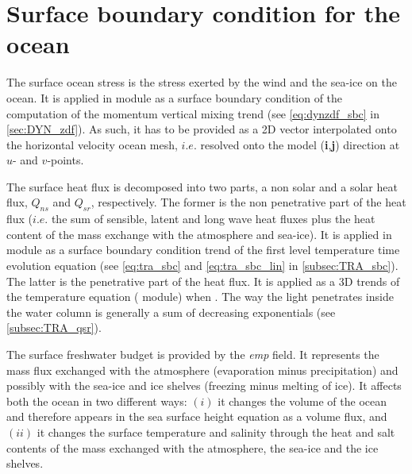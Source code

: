 \documentclass[../tex_main/NEMO_manual]{subfiles}
\begin{document}
\section{Surface boundary condition for the ocean}
\label{sec:SBC_general}

The surface ocean stress is the stress exerted by the wind and the sea-ice 
on the ocean. It is applied in  module as a surface boundary condition of the 
computation of the momentum vertical mixing trend (see \autoref{eq:dynzdf_sbc} in \autoref{sec:DYN_zdf}).
As such, it has to be provided as a 2D vector interpolated 
onto the horizontal velocity ocean mesh, $i.e.$ resolved onto the model 
(\textbf{i},\textbf{j}) direction at $u$- and $v$-points.

The surface heat flux is decomposed into two parts, a non solar and a solar heat 
flux, $Q_{ns}$ and $Q_{sr}$, respectively. The former is the non penetrative part 
of the heat flux ($i.e.$ the sum of sensible, latent and long wave heat fluxes 
plus the heat content of the mass exchange with the atmosphere and sea-ice). 
It is applied in  module as a surface boundary condition trend of 
the first level temperature time evolution equation (see \autoref{eq:tra_sbc} 
and \autoref{eq:tra_sbc_lin} in \autoref{subsec:TRA_sbc}). 
The latter is the penetrative part of the heat flux. It is applied as a 3D 
trends of the temperature equation ( module) when .
The way the light penetrates inside the water column is generally a sum of decreasing 
exponentials (see \autoref{subsec:TRA_qsr}). 

The surface freshwater budget is provided by the \textit{emp} field.
It represents the mass flux exchanged with the atmosphere (evaporation minus precipitation) 
and possibly with the sea-ice and ice shelves (freezing minus melting of ice). 
It affects both the ocean in two different ways: 
$(i)$   it changes the volume of the ocean and therefore appears in the sea surface height 
equation as a volume flux, and 
$(ii)$  it changes the surface temperature and salinity through the heat and salt contents 
of the mass exchanged with the atmosphere, the sea-ice and the ice shelves. 


%
%
%
%
%
%
% 
%
\end{document}
